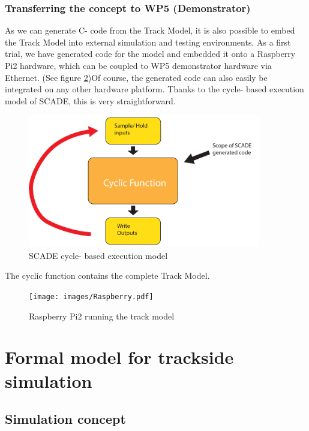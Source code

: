\documentclass{template/openetcs_article}
\begin{document}
\subsubsection{Transferring the concept to WP5 (Demonstrator)}

As we can generate C- code from the Track Model, it is also possible to embed the Track Model into external simulation and testing environments.  As a first trial, we have generated code for the model and embedded it onto a Raspberry Pi2 hardware, which can be coupled to WP5 demonstrator hardware via Ethernet. (See figure \ref{fig:raspb})\newline Of course, the generated code can also easily be integrated on any other hardware platform. Thanks to the cycle- based execution model of SCADE, this is very straightforward.

\begin{figure}[H]
  \centering
  \includegraphics[width=4in]{images/cyclscade}
  \caption{SCADE cycle- based execution model}
  \label{fig:SCcycle}
\end{figure}

The cyclic function contains the complete Track Model. 
\begin{figure}
  \centering
  \texttt{[image: images/Raspberry.pdf]}
  \caption{Raspberry Pi2 running the track model}
  \label{fig:raspb}
\end{figure}

\newpage

\section{Formal model for trackside simulation}
\subsection{Simulation concept}
\end{document}
